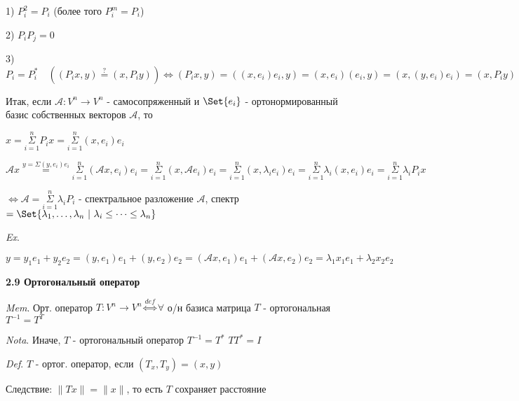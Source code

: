 \documentclass[12pt]{article}
\begin{document}
    1) $P_i^2 = P_i$ (более того $P^m_i = P_i$)

    2) $P_i P_j = 0$

    3) $P_i = P_i^* \quad ((P_i x, y) \stackrel{?}{=} (x, P_i y)) \Longleftrightarrow (P_i x, y) = ((x, e_i) e_i, y) = (x, e_i) (e_i, y) = (x, (y, e_i) e_i) = (x, P_i y)$

    Итак, если $\mathcal{A}: V^n \to V^n$ - самосопряженный и $\Set{e_i}$ - ортонормированный базис собственных векторов $\mathcal{A}$, то

    $\displaystyle x = \overset{n}{\underset{i = 1}{\Sigma}} P_i x = \overset{n}{\underset{i = 1}{\Sigma}} (x, e_i) e_i$

    $\displaystyle \mathcal{A} x \stackrel{y = \Sigma (y, e_i) e_i}{=} \overset{n}{\underset{i = 1}{\Sigma}} (\mathcal{A}x, e_i) e_i =
    \overset{n}{\underset{i = 1}{\Sigma}} (x, \mathcal{A}e_i) e_i = \overset{n}{\underset{i = 1}{\Sigma}} (x, \lambda_i e_i) e_i =
    \overset{n}{\underset{i = 1}{\Sigma}} \lambda_i (x, e_i) e_i = \overset{n}{\underset{i = 1}{\Sigma}} \lambda_i P_i x$

    $\displaystyle \Longleftrightarrow \mathcal{A} = \overset{n}{\underset{i = 1}{\Sigma}} \lambda_i P_i$ - спектральное разложение $\mathcal{A}$,
    спектр $= \Set{\lambda_1, \dots, \lambda_n \ | \ \lambda_i \leq \dots \leq \lambda_n}$

    \vspace{3mm}
\textit{Ex}.

    $y = y_1 e_1 + y_2 e_2 = (y, e_1) e_1 + (y, e_2) e_2 = (\mathcal{A}x, e_1) e_1 + (\mathcal{A}x, e_2) e_2 = \lambda_1 x_1 e_1 + \lambda_2 x_2 e_2$

    \vspace{10mm}

    \textbf{2.9 Ортогональный оператор}

    \vspace{3mm}
\textit{Mem}. Орт. оператор $T: V^n \to V^n \overset{def}{\Longleftrightarrow} \forall$ о/н базиса матрица $T$ - ортогональная $T^{-1} = T^T$

    \vspace{3mm}
\textit{Nota}. Иначе, $T$ - ортогональный оператор \Longleftrightarrow $T^{-1} = T^*$ \Longrightarrow $T T^* = I$

    \vspace{3mm}
\textit{Def}. $T$ - ортог. оператор, если $(T_x, T_y) = (x, y)$

    Следствие: $\|Tx\| = \|x\|$, то есть $T$ сохраняет расстояние
\end{document}
